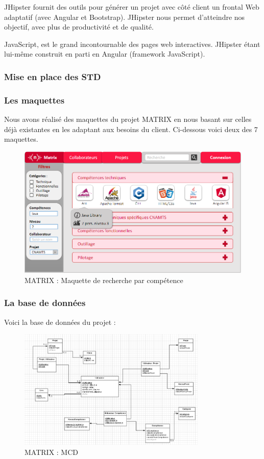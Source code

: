 JHipster fournit des outils pour générer un projet avec côté client un frontal Web adaptatif (avec Angular et Bootstrap). JHipster nous permet d'atteindre nos objectif, avec plus de productivité et de qualité.

JavaScript, est le grand incontournable des pages web interactives. JHipster étant lui-même construit en parti en Angular (framework JavaScript).

\subsubsection{Mise en place des STD}

\subsubsection{Les maquettes}

Nous avons réalisé des maquettes du projet MATRIX en nous basant sur celles déjà existantes en les adaptant aux besoins du client. Ci-dessous voici deux des 7 maquettes.

\begin{figure}[!h]
\centering
\includegraphics[width=1\textwidth]{images/matrix-maquette.png}
\caption{MATRIX : Maquette de recherche par compétence}
\end{figure}

\subsubsection{La base de données}

Voici la base de données du projet :
\begin{figure}[H]
\centering
\includegraphics[width=0.8\textwidth]{images/matrix-bdd.png}
\caption{MATRIX : MCD}
\end{figure}

